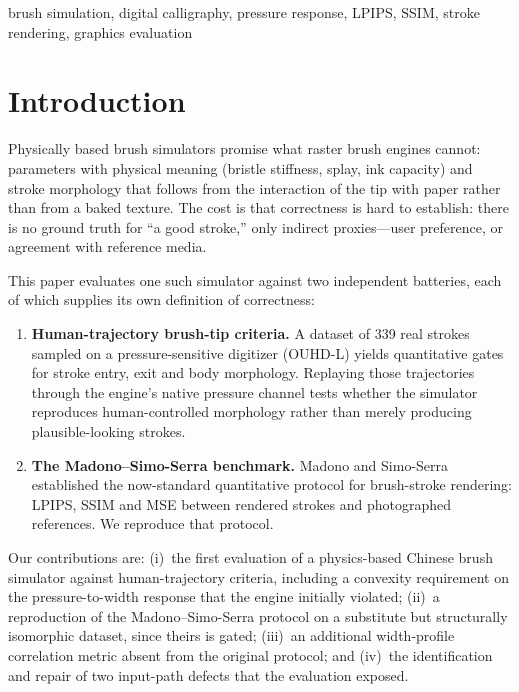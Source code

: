 \documentclass[conference]{IEEEtran}
\begin{document}
\begin{IEEEkeywords}
brush simulation, digital calligraphy, pressure response, LPIPS, SSIM,
stroke rendering, graphics evaluation
\end{IEEEkeywords}

\section{Introduction}

Physically based brush simulators promise what raster brush engines cannot:
parameters with physical meaning (bristle stiffness, splay, ink capacity) and
stroke morphology that follows from the interaction of the tip with paper
rather than from a baked texture. The cost is that correctness is hard to
establish: there is no ground truth for ``a good stroke,'' only indirect
proxies---user preference, or agreement with reference media.

This paper evaluates one such simulator against two independent batteries,
each of which supplies its own definition of correctness:

\begin{enumerate}
\item \textbf{Human-trajectory brush-tip criteria.} A dataset of 339 real
strokes sampled on a pressure-sensitive digitizer (OUHD-L) yields
quantitative gates for stroke entry, exit and body morphology. Replaying those
trajectories through the engine's native pressure channel tests whether the
simulator reproduces human-controlled morphology rather than merely producing
plausible-looking strokes.
\item \textbf{The Madono--Simo-Serra benchmark.} Madono and Simo-Serra
\cite{madono2023} established the now-standard quantitative protocol for
brush-stroke rendering: LPIPS, SSIM and MSE between rendered strokes and
photographed references. We reproduce that protocol.
\end{enumerate}

Our contributions are: (i)~the first evaluation of a physics-based Chinese
brush simulator against human-trajectory criteria, including a convexity
requirement on the pressure-to-width response that the engine initially
violated; (ii)~a reproduction of the Madono--Simo-Serra protocol on a
substitute but structurally isomorphic dataset, since theirs is gated;
(iii)~an additional width-profile correlation metric absent from the original
protocol; and (iv)~the identification and repair of two input-path defects
that the evaluation exposed.
\end{document}

